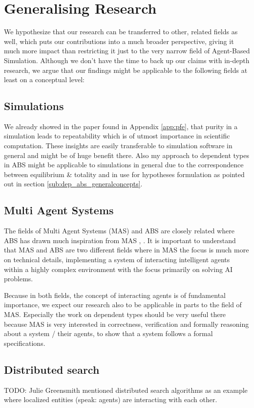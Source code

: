 \chapter{Generalising Research}
\label{chap:generalising}

We hypothesize that our research can be transferred to other, related fields as well, which puts our contributions into a much broader perspective, giving it much more impact than restricting it just to the very narrow field of Agent-Based Simulation. Although we don't have the time to back up our claims with in-depth research, we argue that our findings might be applicable to the following fields at least on a conceptual level:

\section{Simulations}
We already showed in the paper found in Appendix \ref{app:pfe}, that purity in a simulation leads to repeatability which is of utmost importance in scientific computation. These insights are easily transferable to simulation software in general and might be of huge benefit there. Also my approach to dependent types in ABS might be applicable to simulations in general due to the correspondence between equilibrium \& totality and in use for hypotheses formulation as pointed out in section \ref{sub:dep_abs_generalconcepts}. 

\section{Multi Agent Systems}
The fields of Multi Agent Systems (MAS) and ABS are closely related where ABS has drawn much inspiration from MAS \cite{wooldridge_introduction_2009}, \cite{weiss_multiagent_2013}. It is important to understand that MAS and ABS are two different fields where in MAS the focus is much more on technical details, implementing a system of interacting intelligent agents within a highly complex environment with the focus primarily on solving AI problems.

Because in both fields, the concept of interacting agents is of fundamental importance, we expect our research also to be applicable in parts to the field of MAS. Especially the work on dependent types should be very useful there because MAS is very interested in correctness, verification and formally reasoning about a system / their agents, to show that a system follows a formal specifications.

\section{Distributed search}
TODO: Julie Greensmith mentioned distributed search algorithms as an example where localized entities (speak: agents) are interacting with each other.